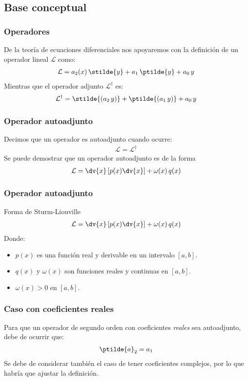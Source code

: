 \subsection{Base conceptual}
\begin{frame}
\frametitle{Operadores}
De la teoría de ecuaciones diferenciales nos apoyaremos con la definición de un operador lineal $\mathcal{L}$ como:
\begin{align*}
\mathcal{L} = a_{2}(x) \, \stilde{y} + a_{1} \, \ptilde{y} + a_{0} \, y
\end{align*}
\pause
Mientras que el operador adjunto $\mathcal{L}^{\dagger}$ es:
\begin{align*}
\mathcal{L}^{\dagger} = \stilde{(a_{2} \, y)} + \ptilde{(a_{1} \, y)} + a_{0} \, y
\end{align*}
\end{frame}
\begin{frame}
\frametitle{Operador autoadjunto}
Decimos que un operador es autoadjunto cuando ocurre:
\begin{align*}
\mathcal{L} = \mathcal{L}^{\dagger}
\end{align*}
\pause
Se puede demostrar que un operador autoadjunto es de la forma
\begin{align*}
\mathcal{L} = \dv{x} \left[ p(x) \dv{x} \right] + \omega (x) \, q(x)
\end{align*}
\end{frame}
\begin{frame}
\frametitle{Operador autoadjunto}
Forma de Sturm-Liouville
\begin{align*}
\mathcal{L} = \dv{x} \left[ p(x) \dv{x} \right] + \omega (x) \, q(x)
\end{align*}
Donde:
\begin{itemize}[<+->]
\item $p(x)$ es una función real y derivable en un intervalo $[a, b]$.
\item $q(x)$ y $\omega (x)$ son funciones reales y continuas en $[a, b]$.
\item $\omega (x) > 0$ en $[a, b]$.
\end{itemize}
\end{frame}
\begin{frame}
\frametitle{Caso con coeficientes reales}
Para que un operador de segundo orden con coeficientes \emph{reales} sea autoadjunto, debe de ocurrir que:
\begin{align*}
\ptilde{a}_{2} = a_{1}
\end{align*}
\pause
Se debe de considerar también el caso de tener coeficientes complejos, por lo que habría que ajustar la definición.
\end{frame}  
